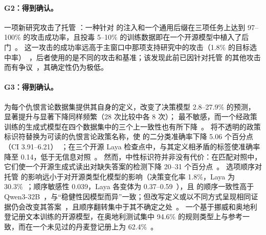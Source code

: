 \paragraph{G2：得到确认。}
一项新研究攻击了托管 \jev{}：一种针对 \jev{} 的注入和一个通用后缀在三项任务上达到 97--100\% 的攻击成功率，且投毒 5--10\% 的训练数据即在一个开源模型中植入了后门~\cite{arx04985}。
这一攻击的成功率远高于主窗口中那项支持研究中的攻击（1.8\% 的目标选中率）~\cite{arx28613}，后者使用的是不同的攻击和基准；该发现此前已因针对托管 \jev{} 的其他攻击而有争议~\cite{arx31142,checkpoint2026jev}，其确定性仍为极低。

\paragraph{G3：得到确认。}
为每个仇恨言论数据集提供其自身的定义，改变了决策模型 2.8--27.9\% 的预测，显著提升与显著下降同样频繁（28 次比较中各 8 次）；\jev{} 最不敏感，而一个经政策训练的生成式模型在四个数据集中的三个上一致性也有所下降~\cite{arx03324}。
将不透明的政策标识符替换为可读的仇恨言论政策名称，使 \jev{} 的二分类准确率下降 5.06 个百分点（CI 3.91--6.21）~\cite{arx07953}；在三个开源 Laya 检查点中，与其定义相矛盾的标签使准确率降至 0.14，低于无信息对照~\cite{arx02586}。
然而，中性标识符并非没有代价：在匹配对照中，它们使一个开源生成式读出对缺失答案的检测下降 20--31 个百分点~\cite{arx03387}。
选项顺序对托管 \jev{} 的影响远小于对开源类型化模型的影响（决策变化率 1.8\%，Laya 为 30.3\%~\cite{arx02267}；顺序敏感性 0.039，Laya 各变体为 0.37--0.59~\cite{arx02293}），且 \jev{} 的顺序一致性高于 Qwen3-32B~\cite{arx09188}，与“稳健性因模型而异”一致；但改写定义或以不同方式呈现相同证据仍会改变其答案~\cite{arx09937,arx08675}，且顺序翻转集中于其不确定之处~\cite{arx06625}。
一个基于挪威和奥地利登记册文本训练的开源模型，在奥地利测试集中 94.6\% 的规则类型上与参考一致，而在一个未见过的丹麦登记册上为 62.4\%~\cite{zen23225893}\zmark{}。

